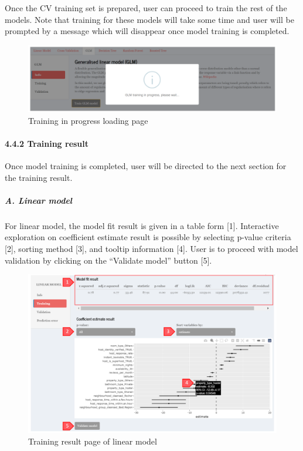 \documentclass[
  12pt,
]{article}
\begin{document}
Once the CV training set is prepared, user can proceed to train the rest
of the models. Note that training for these models will take some time
and user will be prompted by a message which will disappear once model
training is completed.

\begin{figure}[H]

{\centering \includegraphics[width=0.95\linewidth]{images/mdltrain2} 

}

\caption{Training in progress loading page}\label{fig:unnamed-chunk-19}
\end{figure}

\hypertarget{training-result}{%
\paragraph{4.4.2 Training result}\label{training-result}}

Once model training is completed, user will be directed to the next
section for the training result.

\hypertarget{a.-linear-model}{%
\subparagraph{A. Linear model}\label{a.-linear-model}}

For linear model, the model fit result is given in a table form {[}1{]}.
Interactive exploration on coefficient estimate result is possible by
selecting p-value criteria {[}2{]}, sorting method {[}3{]}, and tooltip
information {[}4{]}. User is to proceed with model validation by
clicking on the ``Validate model'' button {[}5{]}.

\begin{figure}[H]

{\centering \includegraphics[width=0.95\linewidth]{images/mdltrain3} 

}

\caption{Training result page of linear model}\label{fig:unnamed-chunk-20}
\end{figure}
\end{document}

